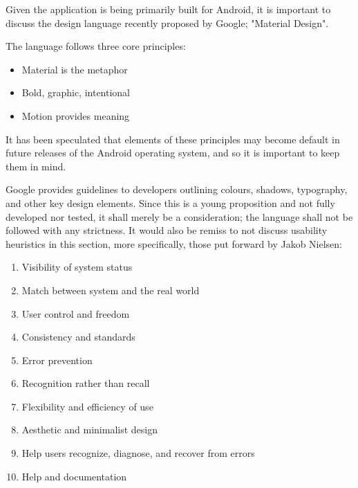 \documentclass[a4paper]{article}
\begin{document}
Given the application is being primarily built for Android, it is important to discuss the design language recently proposed by Google; "Material Design".

The language follows three core principles:

\begin{itemize}
\item Material is the metaphor
\item Bold, graphic, intentional
\item Motion provides meaning
\end{itemize}


It has been speculated that elements of these principles may become default in future releases of the Android operating system, and so it is important to keep them in mind.

Google provides guidelines to developers outlining colours, shadows, typography, and other key design elements. Since this is a young proposition and not fully developed nor tested, it shall merely be a consideration; the language shall not be followed with any strictness.
It would also be remiss to not discuss usability heuristics in this section, more specifically, those put forward by Jakob Nielsen: \cite{Nielsen}

\begin{enumerate}
\item Visibility of system status

\item Match between system and the real world
 
\item User control and freedom

\item Consistency and standards

\item Error prevention

\item Recognition rather than recall
 
\item Flexibility and efficiency of use

\item Aesthetic and minimalist design

\item Help users recognize, diagnose, and recover from errors

\item Help and documentation

\end{enumerate}
\end{document}
